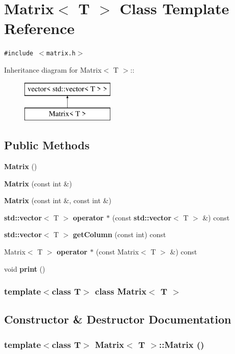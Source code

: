 \section{Matrix$<$ T $>$ Class Template Reference}
\label{classMatrix}
{\tt \#include $<$matrix.h$>$}

Inheritance diagram for Matrix$<$ T $>$::\begin{figure}[H]
\begin{center}
\leavevmode
\includegraphics[height=2cm]{classMatrix}
\end{center}
\end{figure}
\subsection*{Public Methods}
\begin{CompactItemize}
\item 
{\bf Matrix} ()
\item 
{\bf Matrix} (const int \&)
\item 
{\bf Matrix} (const int \&, const int \&)
\item 
{\bf std::vector}$<$ T $>$ {\bf operator $\ast$} (const {\bf std::vector}$<$ T $>$ \&) const
\item 
{\bf std::vector}$<$ T $>$ {\bf get\-Column} (const int) const
\item 
Matrix$<$ T $>$ {\bf operator $\ast$} (const Matrix$<$ T $>$ \&) const
\item 
void {\bf print} ()
\end{CompactItemize}
\subsubsection*{template$<$class T$>$ class Matrix$<$ T $>$}



\subsection{Constructor \& Destructor Documentation}
\subsubsection{\setlength{\rightskip}{0pt plus 5cm}template$<$class T$>$ Matrix$<$ T $>$::Matrix ()}\label{classMatrix_a0}


